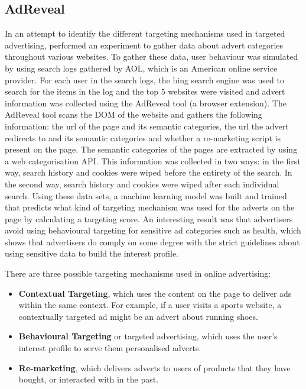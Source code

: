 \documentclass{l4proj}
\begin{document}
\subsection{AdReveal}
In an attempt to identify the different targeting mechanisms used in targeted advertising, \cite{Liu2013} performed an experiment to gather data about advert categories throughout various websites. To gather these data, user behaviour was simulated by using search logs gathered by AOL, which is an American online service provider. 
For each user in the search logs, the bing search engine was used to search for the items in the log and the top 5 websites were visited and advert information was collected using the AdReveal tool (a browser extension). The AdReveal tool scans the DOM of the website and gathers the following information: the url of the page and its semantic categories, the url the advert redirects to and its semantic categories and whether a re-marketing script is present on the page. The semantic categories of the pages are extracted by using a web categorisation API. 
This information was collected in two ways: in the first way, search history and cookies were wiped before the entirety of the search. In the second way, search history and cookies were wiped after each individual search. Using these data sets, a machine learning model was built and trained that predicts what kind of targeting mechanism was used for the adverts on the page by calculating a targeting score. An interesting result was that advertisers avoid using behavioural targeting for sensitive ad categories such as health, which shows that advertisers do comply on some degree with the strict guidelines about using sensitive data to build the interest profile.

There are three possible targeting mechanisms used in online advertising:
\begin{itemize}
    \item \textbf{Contextual Targeting}, which uses the content on the page to deliver ads within the same context. For example, if a user visits a sports website, a contextually targeted ad might be an advert about running shoes.
    \item \textbf{Behavioural Targeting} or targeted advertising, which uses the user's interest profile to serve them personalised adverts.
    \item \textbf{Re-marketing}, which delivers adverts to users of products that they have bought, or interacted with in the past.
\end{itemize}
\end{document}
